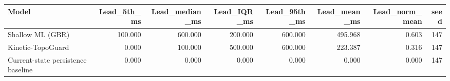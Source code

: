 \begin{tabular}{lrrrrrrr}
\toprule
Model & Lead\_5th\_ms & Lead\_median\_ms & Lead\_IQR\_ms & Lead\_95th\_ms & Lead\_mean\_ms & Lead\_norm\_mean & seed \\
\midrule
Shallow ML (GBR) & 100.000 & 600.000 & 200.000 & 600.000 & 495.968 & 0.603 & 147 \\
Kinetic-TopoGuard & 0.000 & 100.000 & 500.000 & 600.000 & 223.387 & 0.316 & 147 \\
Current-state persistence baseline & 0.000 & 0.000 & 0.000 & 0.000 & 0.000 & 0.000 & 147 \\
\bottomrule
\end{tabular}
